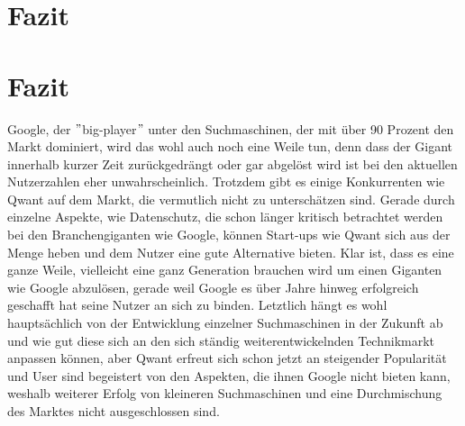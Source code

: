 \documentclass[11pt]{article}
\begin{document}
\chapter{Fazit}\label{ch:fazit}

    \chapter{Fazit}\label{ch:fazit2}

    Google, der \("\)big-player\("\) unter den Suchmaschinen, der mit über 90 Prozent den Markt dominiert,
    wird das wohl auch noch eine Weile tun, denn dass der Gigant innerhalb kurzer Zeit zurückgedrängt oder gar abgelöst wird ist bei den aktuellen Nutzerzahlen eher unwahrscheinlich.
    Trotzdem gibt es einige Konkurrenten wie Qwant auf dem Markt, die vermutlich nicht zu unterschätzen sind.
    Gerade durch einzelne Aspekte, wie Datenschutz, die schon länger kritisch betrachtet werden bei den Branchengiganten wie Google,
    können Start-ups wie Qwant sich aus der Menge heben und dem Nutzer eine gute Alternative bieten.
    Klar ist, dass es eine ganze Weile, vielleicht eine ganz Generation brauchen wird um einen Giganten wie Google abzulösen,
    gerade weil Google es über Jahre hinweg erfolgreich geschafft hat seine Nutzer an sich zu binden.
    Letztlich hängt es wohl hauptsächlich von der Entwicklung einzelner Suchmaschinen in der Zukunft ab und wie gut diese sich an den sich ständig weiterentwickelnden Technikmarkt anpassen können,
    aber Qwant erfreut sich schon jetzt an steigender Popularität und User sind begeistert von den Aspekten, die ihnen Google nicht bieten kann,
    weshalb weiterer Erfolg von kleineren Suchmaschinen und eine Durchmischung des Marktes nicht ausgeschlossen sind.
\end{document}
